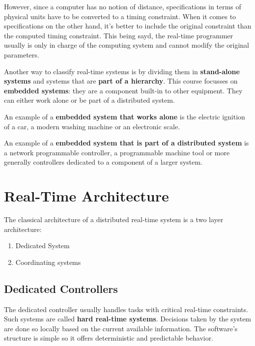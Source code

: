 \documentclass[../main.tex]{subfiles}
\begin{document}
However, since a computer has no notion of distance, specifications in terms of physical units have to be converted to a timing constraint. When it comes to specifications on the other hand, it's better to include the original constraint than the computed timing constraint. This being sayd, the real-time programmer usually is only in charge of the computing system and cannot modify the original parameters.

Another way to classify real-time systems is by dividing them in \textbf{stand-alone systems} and systems that are \textbf{part of a hierarchy}. This course focusses on \textbf{embedded systems}: they are a component built-in to other equipment. They can either work alone or be part of a distributed system.

\begin{exmp}
An example of a \textbf{embedded system that works alone} is the electric ignition of a car, a modern washing machine or an electronic scale.
\end{exmp} 

\begin{exmp}
An example of a \textbf{embedded system that is part of a distributed system} is a network programmable controller, a programmable machine tool or more generally controllers dedicated to a component of a larger system.
\end{exmp} 


\section{Real-Time Architecture}
The classical architecture of a distributed real-time system is a two layer architecture:
\begin{enumerate}
	\item Dedicated System
	\item Coordinating systems
\end{enumerate}

\subsection{Dedicated Controllers}
The dedicated controller usually handles tasks with critical real-time constraints. Such systems are called \textbf{hard real-time systems}. Decisions taken by the system are done so locally based on the current available information. The software's structure is simple so it offers deterministic and predictable behavior. 
 
\end{document}
